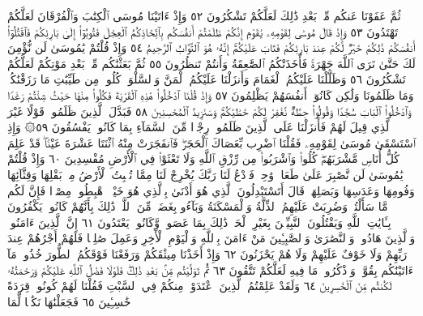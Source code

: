ثُمَّ عَفَوْنَا عَنكُم مِّنۢ بَعْدِ ذَٰلِكَ لَعَلَّكُمْ تَشْكُرُونَ ٥٢
وَإِذْ ءَاتَيْنَا مُوسَى ٱلْكِتَٰبَ وَٱلْفُرْقَانَ لَعَلَّكُمْ تَهْتَدُونَ ٥٣
وَإِذْ قَالَ مُوسَىٰ لِقَوْمِهِۦ يَٰقَوْمِ إِنَّكُمْ ظَلَمْتُمْ أَنفُسَكُم بِٱتِّخَاذِكُمُ
ٱلْعِجْلَ فَتُوبُوٓا۟ إِلَىٰ بَارِئِكُمْ فَٱقْتُلُوٓا۟ أَنفُسَكُمْ ذَٰلِكُمْ
خَيْرࣱ لَّكُمْ عِندَ بَارِئِكُمْ فَتَابَ عَلَيْكُمْۚ إِنَّهُۥ هُوَ ٱلتَّوَّابُ
ٱلرَّحِيمُ ٥٤ وَإِذْ قُلْتُمْ يَٰمُوسَىٰ لَن نُّؤْمِنَ لَكَ حَتَّىٰ نَرَى ٱللَّهَ
جَهْرَةࣰ فَأَخَذَتْكُمُ ٱلصَّٰعِقَةُ وَأَنتُمْ تَنظُرُونَ ٥٥ ثُمَّ بَعَثْنَٰكُم
مِّنۢ بَعْدِ مَوْتِكُمْ لَعَلَّكُمْ تَشْكُرُونَ ٥٦ وَظَلَّلْنَا عَلَيْكُمُ
ٱلْغَمَامَ وَأَنزَلْنَا عَلَيْكُمُ ٱلْمَنَّ وَٱلسَّلْوَىٰۖ كُلُوا۟ مِن طَيِّبَٰتِ
مَا رَزَقْنَٰكُمْۚ وَمَا ظَلَمُونَا وَلَٰكِن كَانُوٓا۟ أَنفُسَهُمْ يَظْلِمُونَ ٥٧
وَإِذْ قُلْنَا ٱدْخُلُوا۟ هَٰذِهِ ٱلْقَرْيَةَ فَكُلُوا۟ مِنْهَا حَيْثُ شِئْتُمْ
رَغَدࣰا وَٱدْخُلُوا۟ ٱلْبَابَ سُجَّدࣰا وَقُولُوا۟ حِطَّةࣱ نَّغْفِرْ لَكُمْ
خَطَٰيَٰكُمْۚ وَسَنَزِيدُ ٱلْمُحْسِنِينَ ٥٨ فَبَدَّلَ ٱلَّذِينَ
ظَلَمُوا۟ قَوْلًا غَيْرَ ٱلَّذِي قِيلَ لَهُمْ فَأَنزَلْنَا عَلَى ٱلَّذِينَ ظَلَمُوا۟
رِجْزࣰا مِّنَ ٱلسَّمَآءِ بِمَا كَانُوا۟ يَفْسُقُونَ ٥٩۞ وَإِذِ ٱسْتَسْقَىٰ
مُوسَىٰ لِقَوْمِهِۦ فَقُلْنَا ٱضْرِب بِّعَصَاكَ ٱلْحَجَرَۖ فَٱنفَجَرَتْ
مِنْهُ ٱثْنَتَا عَشْرَةَ عَيْنࣰاۖ قَدْ عَلِمَ كُلُّ أُنَاسࣲ مَّشْرَبَهُمْۖ كُلُوا۟
وَٱشْرَبُوا۟ مِن رِّزْقِ ٱللَّهِ وَلَا تَعْثَوْا۟ فِي ٱلْأَرْضِ مُفْسِدِينَ ٦٠
وَإِذْ قُلْتُمْ يَٰمُوسَىٰ لَن نَّصْبِرَ عَلَىٰ طَعَامࣲ وَٰحِدࣲ فَٱدْعُ لَنَا
رَبَّكَ يُخْرِجْ لَنَا مِمَّا تُنۢبِتُ ٱلْأَرْضُ مِنۢ بَقْلِهَا وَقِثَّآئِهَا
وَفُومِهَا وَعَدَسِهَا وَبَصَلِهَاۖ قَالَ أَتَسْتَبْدِلُونَ ٱلَّذِي هُوَ
أَدْنَىٰ بِٱلَّذِي هُوَ خَيْرٌۚ ٱهْبِطُوا۟ مِصْرࣰا فَإِنَّ لَكُم مَّا سَأَلْتُمْۗ
وَضُرِبَتْ عَلَيْهِمُ ٱلذِّلَّةُ وَٱلْمَسْكَنَةُ وَبَآءُو بِغَضَبࣲ مِّنَ
ٱللَّهِۚ ذَٰلِكَ بِأَنَّهُمْ كَانُوا۟ يَكْفُرُونَ بِـَٔايَٰتِ ٱللَّهِ وَيَقْتُلُونَ
ٱلنَّبِيِّـۧنَ بِغَيْرِ ٱلْحَقِّۚ ذَٰلِكَ بِمَا عَصَوا۟ وَّكَانُوا۟ يَعْتَدُونَ ٦١
إِنَّ ٱلَّذِينَ ءَامَنُوا۟ وَٱلَّذِينَ هَادُوا۟ وَٱلنَّصَٰرَىٰ وَٱلصَّٰبِـِٔينَ مَنْ
ءَامَنَ بِٱللَّهِ وَٱلْيَوْمِ ٱلْأٓخِرِ وَعَمِلَ صَٰلِحࣰا فَلَهُمْ أَجْرُهُمْ عِندَ
رَبِّهِمْ وَلَا خَوْفٌ عَلَيْهِمْ وَلَا هُمْ يَحْزَنُونَ ٦٢ وَإِذْ أَخَذْنَا
مِيثَٰقَكُمْ وَرَفَعْنَا فَوْقَكُمُ ٱلطُّورَ خُذُوا۟ مَآ ءَاتَيْنَٰكُم
بِقُوَّةࣲ وَٱذْكُرُوا۟ مَا فِيهِ لَعَلَّكُمْ تَتَّقُونَ ٦٣ ثُمَّ تَوَلَّيْتُم
مِّنۢ بَعْدِ ذَٰلِكَۖ فَلَوْلَا فَضْلُ ٱللَّهِ عَلَيْكُمْ وَرَحْمَتُهُۥ لَكُنتُم مِّنَ
ٱلْخَٰسِرِينَ ٦٤ وَلَقَدْ عَلِمْتُمُ ٱلَّذِينَ ٱعْتَدَوْا۟ مِنكُمْ فِي ٱلسَّبْتِ
فَقُلْنَا لَهُمْ كُونُوا۟ قِرَدَةً خَٰسِـِٔينَ ٦٥ فَجَعَلْنَٰهَا نَكَٰلࣰا لِّمَا
